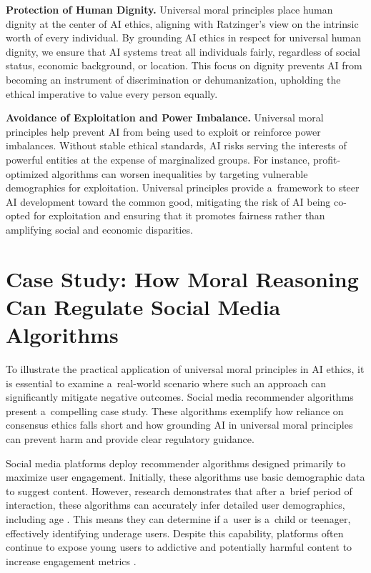 \documentclass[%
  manuscript=article,
  year=2024,
  volume=77,
  doi=00000.000,
]{zfn}
\begin{document}
\textbf{Protection of Human Dignity.} Universal moral principles place human dignity at the center of AI ethics, aligning with Ratzinger's view on the intrinsic worth of every individual. By grounding AI ethics in respect for universal human dignity, we ensure that AI systems treat all individuals fairly, regardless of social status, economic background, or location. This focus on dignity prevents AI from becoming an instrument of discrimination or dehumanization, upholding the ethical imperative to value every person equally.



\textbf{Avoidance of Exploitation and Power Imbalance.} Universal moral principles help prevent AI from being used to exploit or reinforce power imbalances. Without stable ethical standards, AI risks serving the interests of powerful entities at the expense of marginalized groups. For instance, profit-optimized algorithms can worsen inequalities by targeting vulnerable demographics for exploitation. Universal principles provide a~framework to steer AI development toward the common good, mitigating the risk of AI being co-opted for exploitation and ensuring that it promotes fairness rather than amplifying social and economic disparities.



\section{Case Study: How Moral Reasoning Can Regulate Social Media Algorithms}



To illustrate the practical application of universal moral principles in AI ethics, it is essential to examine a~real-world scenario where such an approach can significantly mitigate negative outcomes. Social media recommender algorithms present a~compelling case study. These algorithms exemplify how reliance on consensus ethics falls short and how grounding AI in universal moral principles can prevent harm and provide clear regulatory guidance.



Social media platforms deploy recommender algorithms designed primarily to maximize user engagement. Initially, these algorithms use basic demographic data to suggest content. However, research demonstrates that after a~brief period of interaction, these algorithms can accurately infer detailed user demographics, including age 
\parencite[][]{narayanan_understanding_2023}. %
 This means they can determine if a~user is a~child or teenager, effectively identifying underage users. Despite this capability, platforms often continue to expose young users to addictive and potentially harmful content to increase engagement metrics 
\parencite[][]{panoptykon_foundation_fixing_2023}.%
\end{document}
